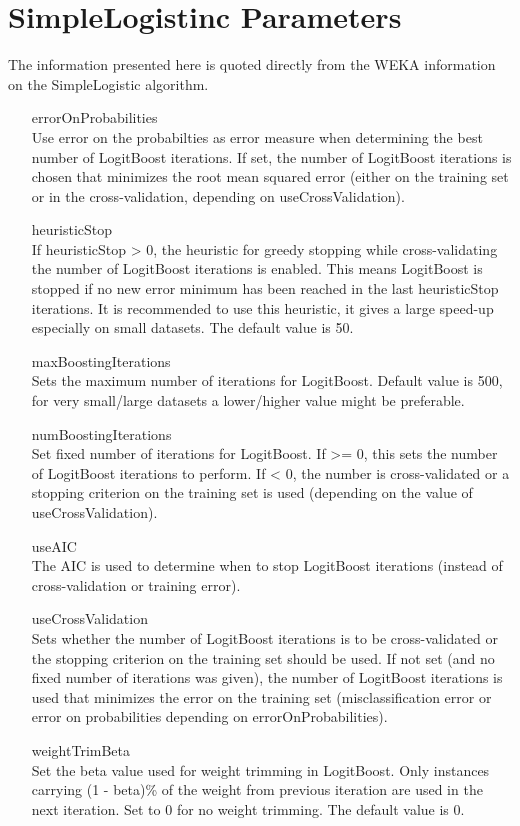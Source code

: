 \documentclass[12pt,twocolumn,a4paper]{article}
\begin{document}
\section{SimpleLogistinc Parameters}
\label{sec:det}
The information presented here is quoted directly from the WEKA information on the SimpleLogistic algorithm.
\centering
\begin{itemize}
\item[errorOnProbabilities]\hfill \\  Use error on the probabilties as error measure when determining the best number of LogitBoost iterations. If set, the number of LogitBoost iterations is chosen that minimizes the root mean squared error (either on the training set or in the cross-validation, depending on useCrossValidation).

\item[heuristicStop]\hfill \\  If heuristicStop > 0, the heuristic for greedy stopping while cross-validating the number of LogitBoost iterations is enabled. This means LogitBoost is stopped if no new error minimum has been reached in the last heuristicStop iterations. It is recommended to use this heuristic, it gives a large speed-up especially on small datasets. The default value is 50.

\item[maxBoostingIterations] \hfill \\ Sets the maximum number of iterations for LogitBoost. Default value is 500, for very small/large datasets a lower/higher value might be preferable.

\item[numBoostingIterations] \hfill \\ Set fixed number of iterations for LogitBoost. If >= 0, this sets the number of LogitBoost iterations to perform. If < 0, the number is cross-validated or a stopping criterion on the training set is used (depending on the value of useCrossValidation).

\item[useAIC]\hfill \\  The AIC is used to determine when to stop LogitBoost iterations (instead of cross-validation or training error).

\item[useCrossValidation]\hfill \\  Sets whether the number of LogitBoost iterations is to be cross-validated or the stopping criterion on the training set should be used. If not set (and no fixed number of iterations was given), the number of LogitBoost iterations is used that minimizes the error on the training set (misclassification error or error on probabilities depending on errorOnProbabilities).

\item[weightTrimBeta]\hfill \\  Set the beta value used for weight trimming in LogitBoost. Only instances carrying (1 - beta)\% of the weight from previous iteration are used in the next iteration. Set to 0 for no weight trimming. The default value is 0.
\end{itemize}
\end{document}
